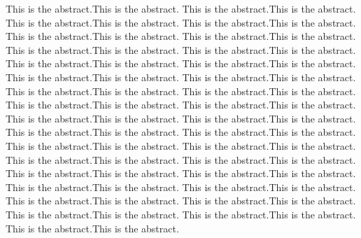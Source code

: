 \newenvironment{abstract}%
    {\cleardoublepage\thispagestyle{empty}\null\vfill\begin{center}%
    \bfseries\abstractname\end{center}}%
    {\vfill\null}
        \begin{abstract}
        This is the abstract.This is the abstract.
        This is the abstract.This is the abstract.
        This is the abstract.This is the abstract.
        This is the abstract.This is the abstract.
        This is the abstract.This is the abstract.
        This is the abstract.This is the abstract.
        This is the abstract.This is the abstract.
        This is the abstract.This is the abstract.
        This is the abstract.This is the abstract.
        This is the abstract.This is the abstract.
        This is the abstract.This is the abstract.
        This is the abstract.This is the abstract.
        This is the abstract.This is the abstract.
        This is the abstract.This is the abstract.
        This is the abstract.This is the abstract.
        This is the abstract.This is the abstract.
        This is the abstract.This is the abstract.
        This is the abstract.This is the abstract.
        This is the abstract.This is the abstract.
        This is the abstract.This is the abstract.
        This is the abstract.This is the abstract.
        This is the abstract.This is the abstract.
        This is the abstract.This is the abstract.
        This is the abstract.This is the abstract.
        This is the abstract.This is the abstract.
        This is the abstract.This is the abstract.
        This is the abstract.This is the abstract.
        This is the abstract.This is the abstract.
        This is the abstract.This is the abstract.
        This is the abstract.This is the abstract.
        This is the abstract.This is the abstract.
        This is the abstract.This is the abstract.
        This is the abstract.This is the abstract.
        \end{abstract}


